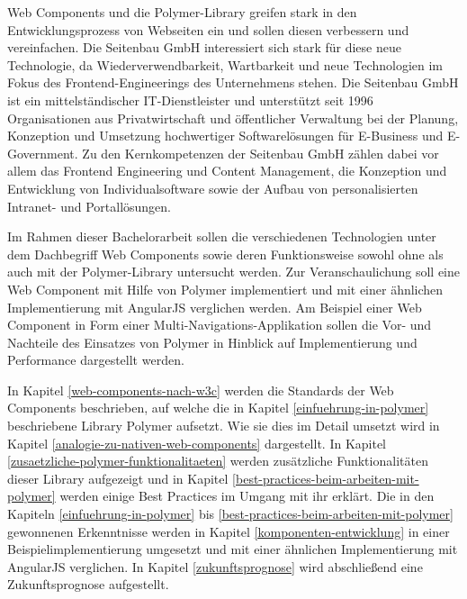 Web Components und die Polymer-Library greifen stark in den Entwicklungsprozess von Webseiten ein und sollen diesen verbessern und vereinfachen. Die Seitenbau GmbH interessiert sich stark für diese neue Technologie, da Wiederverwendbarkeit, Wartbarkeit und neue Technologien im Fokus des Frontend-Engineerings des Unternehmens stehen.
Die Seitenbau GmbH ist ein mittelständischer IT-Dienstleister und unterstützt seit 1996 Organisationen aus Privatwirtschaft und öffentlicher Verwaltung bei der Planung, Konzeption und Umsetzung hochwertiger Softwarelösungen für E-Business und E-Government. Zu den Kernkompetenzen der Seitenbau GmbH zählen dabei vor allem das Frontend Engineering und Content Management, die Konzeption und Entwicklung von Individualsoftware sowie der Aufbau von personalisierten Intranet- und Portallösungen.

Im Rahmen dieser Bachelorarbeit sollen die verschiedenen Technologien unter dem Dachbegriff Web Components sowie deren Funktionsweise sowohl ohne als auch mit der Polymer-Library untersucht werden. Zur Veranschaulichung soll eine Web Component mit Hilfe von Polymer implementiert und mit einer ähnlichen Implementierung mit AngularJS verglichen werden. Am Beispiel einer Web Component in Form einer Multi-Navigations-Applikation sollen die Vor- und Nachteile des Einsatzes von Polymer in Hinblick auf Implementierung und Performance dargestellt werden.

In Kapitel \ref{web-components-nach-w3c} werden die Standards der Web Components beschrieben, auf welche die in Kapitel \ref{einfuehrung-in-polymer} beschriebene Library Polymer aufsetzt. Wie sie dies im Detail umsetzt wird in Kapitel \ref{analogie-zu-nativen-web-components} dargestellt. In Kapitel \ref{zusaetzliche-polymer-funktionalitaeten} werden zusätzliche Funktionalitäten dieser Library aufgezeigt und in Kapitel \ref{best-practices-beim-arbeiten-mit-polymer} werden einige Best Practices im Umgang mit ihr erklärt. Die in den Kapiteln \ref{einfuehrung-in-polymer} bis \ref{best-practices-beim-arbeiten-mit-polymer} gewonnenen Erkenntnisse werden in Kapitel \ref{komponenten-entwicklung} in einer Beispielimplementierung umgesetzt und mit einer ähnlichen Implementierung mit AngularJS verglichen. In Kapitel \ref{zukunftsprognose} wird abschließend eine Zukunftsprognose aufgestellt.
